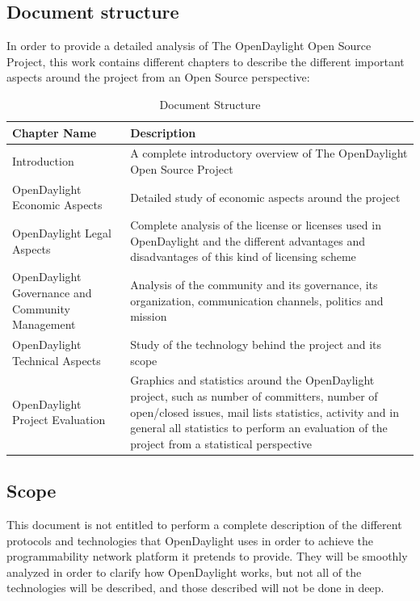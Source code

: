\documentclass[a4paper, 12pt]{book}
\begin{document}
\subsection{Document structure}

In order to provide a detailed analysis of The OpenDaylight Open Source Project, this work contains different chapters to describe the different important aspects around the project from an Open Source perspective:

\begin{table}[H]
\footnotesize
\begin{center}
\begin{tabular}{|p{5cm}|p{10cm}|}
\hline
\textbf{Chapter Name} & \textbf{Description} \\ \hline
Introduction & A complete introductory overview of The OpenDaylight Open Source Project \\
\hline
OpenDaylight Economic Aspects & Detailed study of economic aspects around the project \\
\hline
OpenDaylight Legal Aspects & Complete analysis of the license or licenses used in OpenDaylight and the different advantages and disadvantages of this kind of licensing scheme \\
\hline
OpenDaylight Governance and Community Management & Analysis of the community and its governance, its organization, communication channels, politics and mission \\
\hline
OpenDaylight Technical Aspects & Study of the technology behind the project and its scope \\
\hline
OpenDaylight Project Evaluation & Graphics and statistics around the OpenDaylight project, such as number of committers, number of open/closed issues, mail lists statistics, activity and in general all statistics to perform an evaluation of the project from a statistical perspective \\
\hline
\end{tabular}
\end{center}
\caption{Document Structure}
\label{tab:documentstructure}
\end{table}

\subsection{Scope}
\label{subsec:scope}
This document is not entitled to perform a complete description of the different protocols and technologies that OpenDaylight uses in order to achieve the programmability network platform it pretends to provide. They will be smoothly analyzed in order to clarify how OpenDaylight works, but not all of the technologies will be described, and those described will not be done in deep.
\end{document}
